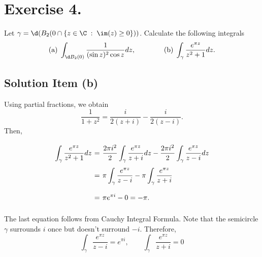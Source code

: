 \section*{Exercise 4.}

Let $\gamma = \d(B_2(0 \cap \{z\in \C \;:\; \im(z) \geq 0\}))$. Calculate the following integrals
\[ \mbox{(a)}\; \int_{\d B_2(0)} \frac{1}{(\sin z)^2 \cos z} dz,\hspace{4em} \mbox{(b)}\; \int_{\gamma} \frac{e^{\pi z}}{z^2 + 1} dz.  \]

\subsection*{Solution Item (b)}

Using partial fractions, we obtain
\[ \frac{1}{1+z^2} = \frac{i}{2(z+i)} - \frac{i}{2(z-i)}. \]
Then,
\[ \everymath{\displaystyle}
\arraycolsep=1.8pt\def\arraystretch{2.5}
\begin{array}{rcl}
    \int_{\gamma} \frac{e^{\pi z}}{z^2 + 1} dz & = & \frac{2\pi i^2}{2}\int_{\gamma} \frac{e^{\pi z}}{z+i} dz - \frac{2\pi i^2}{2}\int_{\gamma} \frac{e^{\pi z}}{z-i} dz\\
    & = & \pi \int_{\gamma} \frac{e^{\pi z}}{z-i} - \pi \int_{\gamma} \frac{e^{\pi z}}{z+i}\\
    & = & \pi e^{\pi i} - 0 = -\pi.
\end{array} \]

The last equation follows from Cauchy Integral Formula. Note that the semicircle $\gamma$ surrounds $i$ once but doesn't surround $-i$. Therefore,
\[ \int_{\gamma} \frac{e^{\pi z}}{z-i} = e^{\pi i},\hspace{2em}  \int_{\gamma} \frac{e^{\pi z}}{z+i} = 0\]